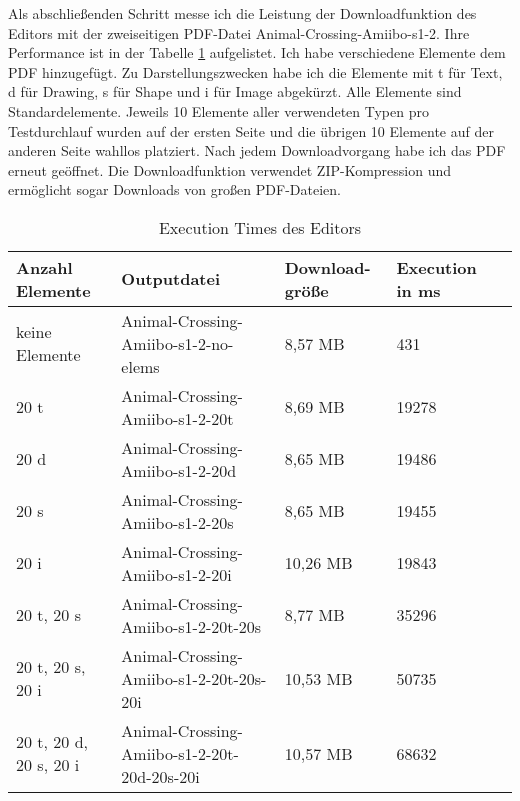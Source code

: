 Als abschließenden Schritt messe ich die Leistung der Downloadfunktion des Editors mit der zweiseitigen PDF-Datei Animal-Crossing-Amiibo-s1-2. Ihre Performance ist in der Tabelle \ref{table:editor-dur} aufgelistet. Ich habe verschiedene Elemente dem PDF hinzugefügt. Zu Darstellungszwecken habe ich die Elemente mit t für Text, d für Drawing, s für Shape und i für Image abgekürzt. Alle Elemente sind Standardelemente. Jeweils 10 Elemente aller verwendeten Typen pro Testdurchlauf wurden auf der ersten Seite und die übrigen 10 Elemente auf der anderen Seite wahllos platziert. Nach jedem Downloadvorgang habe ich das PDF erneut geöffnet. Die Downloadfunktion verwendet ZIP-Kompression und ermöglicht sogar Downloads von großen PDF-Dateien.

\begin{table}[!htbp]
	\centering
	\begin{tabular}{|p{2cm}|p{4cm}|p{2cm}|p{2cm}|p{2cm}|}
		\hline
		\textbf{Anzahl Elemente}			& \textbf{Outputdatei}							& \textbf{Download-größe}	& \textbf{Execution in ms} 	\\ 
		\hline
		keine Elemente 						& Animal-Crossing-Amiibo-s1-2-no-elems			& 8,57 MB					& 431      					\\
		20 t 								& Animal-Crossing-Amiibo-s1-2-20t				& 8,69 MB					& 19278       				\\
		20 d 								& Animal-Crossing-Amiibo-s1-2-20d				& 8,65 MB					& 19486    					\\
		20 s 								& Animal-Crossing-Amiibo-s1-2-20s				& 8,65 MB					& 19455       				\\
		20 i 								& Animal-Crossing-Amiibo-s1-2-20i				& 10,26 MB					& 19843      				\\
		20 t, 20 s 							& Animal-Crossing-Amiibo-s1-2-20t-20s			& 8,77 MB					& 35296      				\\
		20 t, 20 s, 20 i 					& Animal-Crossing-Amiibo-s1-2-20t-20s-20i		& 10,53 MB					& 50735      				\\
		20 t, 20 d, 20 s, 20 i 				& Animal-Crossing-Amiibo-s1-2-20t-20d-20s-20i	& 10,57 MB					& 68632    					\\
		\hline
	\end{tabular}
	\caption{Execution Times des Editors}
	\label{table:editor-dur}
\end{table}